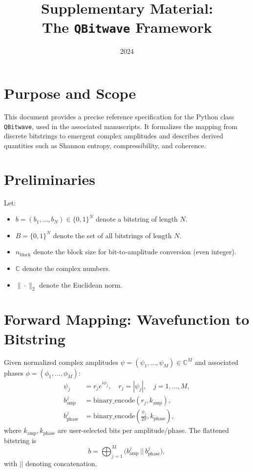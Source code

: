 \documentclass[11pt]{article}
\title{Supplementary Material: \\ The \texttt{QBitwave} Framework}
\date{2024}
\begin{document}
\maketitle

\section{Purpose and Scope}
This document provides a precise reference specification for the Python class \texttt{QBitwave}, used in the associated manuscripts. 
It formalizes the mapping from discrete bitstrings to emergent complex amplitudes and describes derived quantities such as Shannon entropy, compressibility, and coherence.

\section{Preliminaries}
Let:
\begin{itemize}
    \item $b = (b_1,\dots,b_N) \in \{0,1\}^N$ denote a bitstring of length $N$.
    \item $B = \{0,1\}^N$ denote the set of all bitstrings of length $N$.
    \item $n_\text{block}$ denote the block size for bit-to-amplitude conversion (even integer).
    \item $\mathbb{C}$ denote the complex numbers.
    \item $\|\cdot\|_2$ denote the Euclidean norm.
\end{itemize}

\section{Forward Mapping: Wavefunction to Bitstring}
Given normalized complex amplitudes $\psi = (\psi_1, \dots, \psi_M) \in \mathbb{C}^M$ and associated phases $\phi = (\phi_1,\dots,\phi_M)$:
\begin{align}
    \psi_j &= r_j e^{i \phi_j}, \quad r_j = |\psi_j|, \quad j = 1,\dots,M, \\
    b_\text{amp}^j &= \text{binary\_encode}(r_j, k_\text{amp}), \\
    b_\text{phase}^j &= \text{binary\_encode}\left(\frac{\phi_j}{2\pi}, k_\text{phase}\right),
\end{align}
where $k_\text{amp}, k_\text{phase}$ are user-selected bits per amplitude/phase.  
The flattened bitstring is
\[
b = \bigoplus_{j=1}^M \bigl( b_\text{amp}^j \, || \, b_\text{phase}^j \bigr),
\]
with $||$ denoting concatenation.
\end{document}
